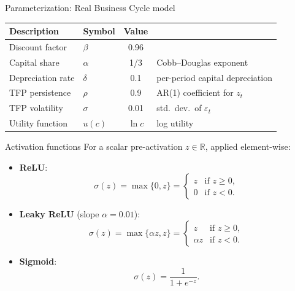 \documentclass[aspectratio=169,10pt]{beamer}
\newcommand{\emphcolor}[1]{\textbf{\textcolor{emphcolorval}{#1}}}
\begin{document}
\begin{frame}[label=rbc-param]{Parameterization: Real Business Cycle model}
	\vspace{0.2in}
	\begin{center}
		\begin{tabular}{llcl}
			\toprule
			Description & Symbol & Value & \\
			\midrule
			Discount factor   & $\beta$  & \textcolor{emphcolorval}{0.96} & \\
			Capital share     & $\alpha$ & \textcolor{emphcolorval}{1/3}  & Cobb--Douglas exponent \\
			Depreciation rate & $\delta$ & \textcolor{emphcolorval}{0.1}  & per-period capital depreciation \\
			TFP persistence   & $\rho$   & \textcolor{emphcolorval}{0.9}  & AR(1) coefficient for $z_t$ \\
			TFP volatility    & $\sigma$ & \textcolor{emphcolorval}{0.01} & std.\ dev.\ of $\varepsilon_t$ \\
			Utility function  & $u(c)$   & \textcolor{emphcolorval}{$\ln c$} & log utility \\
			\bottomrule
		\end{tabular}
	\end{center}
	\vspace{0.1in}
	\hfill\hyperlink{rbc-impl}{}
\end{frame}

\begin{frame}[label=activation-defs]{Activation functions}
	For a scalar pre-activation $z \in \mathbb{R}$, applied element-wise:
	\vspace{0.1in}
	\begin{itemize}
		\item \emphcolor{ReLU}:
		\begin{equation*}
			\sigma(z) = \max\{0, z\} =
			\begin{cases} z & \text{if } z \geq 0, \\ 0 & \text{if } z < 0. \end{cases}
		\end{equation*}
		\vspace{0.05in}
		\item \emphcolor{Leaky ReLU} (slope $\alpha = 0.01$):
		\begin{equation*}
			\sigma(z) = \max\{\alpha z, z\} =
			\begin{cases} z & \text{if } z \geq 0, \\ \alpha z & \text{if } z < 0. \end{cases}
		\end{equation*}
		\vspace{0.05in}
		\item \emphcolor{Sigmoid}:
		\begin{equation*}
			\sigma(z) = \frac{1}{1 + e^{-z}}.
		\end{equation*}
	\end{itemize}
	\vspace{0.05in}
	\hfill\hyperlink{robustness-activations}{}
\end{frame}
\end{document}
